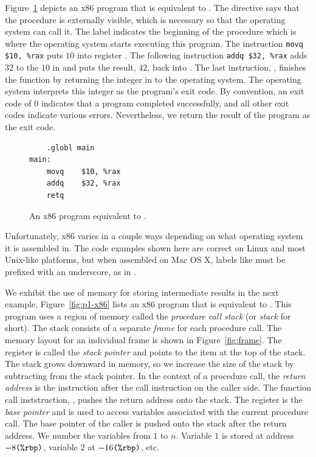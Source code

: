 \documentclass[11pt]{book}
\begin{document}
Figure~\ref{fig:p0-x86} depicts an x86 program that is equivalent
to . The  directive says that the
 procedure is externally visible, which is necessary so
that the operating system can call it. The label 
indicates the beginning of the  procedure which is where
the operating system starts executing this program.  The instruction
\lstinline{movq $10, %rax} puts $10$ into register . The
following instruction \lstinline{addq $32, %rax} adds $32$ to the
$10$ in  and puts the result, $42$, back into
  .
%
The last instruction, , finishes the  function by
returning the integer in  to the operating system. The
operating system interprets this integer as the program's exit
code. By convention, an exit code of 0 indicates that a program
completed successfully, and all other exit codes indicate various
errors.  Nevertheless, we return the result of the program as the exit
code.

\begin{figure}[tbp]
\begin{lstlisting}
	.globl main
main:
	movq	$10, %rax
	addq	$32, %rax
	retq
\end{lstlisting}
\caption{An x86 program equivalent to .}
\label{fig:p0-x86}
\end{figure}

Unfortunately, x86 varies in a couple ways depending on what operating
system it is assembled in. The code examples shown here are correct on
Linux and most Unix-like platforms, but when assembled on Mac OS X,
labels like  must be prefixed with an underscore, as in
.

We exhibit the use of memory for storing intermediate results in the
next example.  Figure~\ref{fig:p1-x86} lists an x86 program that is
equivalent to . This program uses a region of
memory called the \emph{procedure call stack} (or \emph{stack} for
short).  The stack consists
of a separate \emph{frame} for each procedure call. The
memory layout for an individual frame is shown in
Figure~\ref{fig:frame}.  The register  is called the
\emph{stack pointer} and points to the item at
the top of the stack. The stack grows downward in memory, so we
increase the size of the stack by subtracting from the stack pointer.
In the context of a procedure call, the \emph{return
  address} is the instruction after the call
instruction on the caller side. The function call inststruction,
, pushes the return address onto the stack.  The register
 is the \emph{base pointer} and is used
to access variables associated with the current procedure call.  The
base pointer of the caller is pushed onto the stack after the return
address. We number the variables from $1$ to $n$. Variable $1$ is
stored at address $-8\texttt{(\%rbp)}$, variable $2$ at
$-16\texttt{(\%rbp)}$, etc.
\end{document}

